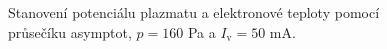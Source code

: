 \documentclass[a4paper,12pt]{article}
\begin{document}
\newpage
\begin{figure}[h]
	\centering
	\begin{subfigure}[b]{.49\textwidth}
		\centering
	\end{subfigure}
	\begin{subfigure}[b]{.49\textwidth}
		\centering
	\end{subfigure}
	\caption{Stanovení potenciálu plazmatu a elektronové teploty pomocí 
		průsečíku asymptot, $p = 160$ \si{\pascal} a $I_\text{v} = 50$ 
		\si{\milli\ampere}.}
	\label{data2}
\end{figure}
\end{document}
